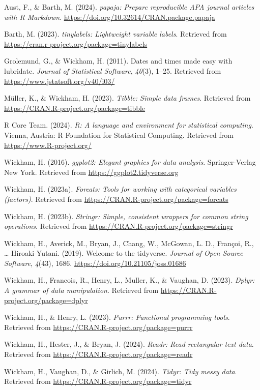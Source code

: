 \documentclass[
  man,floatsintext]{apa6}
\newlength{\cslhangindent}
\newenvironment{CSLReferences}[2] %
 {\begin{list}{}{%
  \setlength{\itemindent}{0pt}
  \setlength{\leftmargin}{0pt}
  \setlength{\parsep}{0pt}
  \ifodd #1
   \setlength{\leftmargin}{\cslhangindent}
   \setlength{\itemindent}{-1\cslhangindent}
  \fi
  \setlength{\itemsep}{#2\baselineskip}}}
 {\end{list}}
\begin{document}
\label{refs}
\begin{CSLReferences}{1}{0}
Aust, F., \& Barth, M. (2024). \emph{{papaja}: {Prepare} reproducible {APA} journal articles with {R Markdown}}. \url{https://doi.org/10.32614/CRAN.package.papaja}

Barth, M. (2023). \emph{{tinylabels}: Lightweight variable labels}. Retrieved from \url{https://cran.r-project.org/package=tinylabels}

Grolemund, G., \& Wickham, H. (2011). Dates and times made easy with {lubridate}. \emph{Journal of Statistical Software}, \emph{40}(3), 1--25. Retrieved from \url{https://www.jstatsoft.org/v40/i03/}

Müller, K., \& Wickham, H. (2023). \emph{Tibble: Simple data frames}. Retrieved from \url{https://CRAN.R-project.org/package=tibble}

R Core Team. (2024). \emph{R: A language and environment for statistical computing}. Vienna, Austria: R Foundation for Statistical Computing. Retrieved from \url{https://www.R-project.org/}

Wickham, H. (2016). \emph{ggplot2: Elegant graphics for data analysis}. Springer-Verlag New York. Retrieved from \url{https://ggplot2.tidyverse.org}

Wickham, H. (2023a). \emph{Forcats: Tools for working with categorical variables (factors)}. Retrieved from \url{https://CRAN.R-project.org/package=forcats}

Wickham, H. (2023b). \emph{Stringr: Simple, consistent wrappers for common string operations}. Retrieved from \url{https://CRAN.R-project.org/package=stringr}

Wickham, H., Averick, M., Bryan, J., Chang, W., McGowan, L. D., Françoi, R., \ldots{} Hiroaki Yutani. (2019). Welcome to the {tidyverse}. \emph{Journal of Open Source Software}, \emph{4}(43), 1686. \url{https://doi.org/10.21105/joss.01686}

Wickham, H., Francois, R., Henry, L., Muller, K., \& Vaughan, D. (2023). \emph{Dplyr: A grammar of data manipulation}. Retrieved from \url{https://CRAN.R-project.org/package=dplyr}

Wickham, H., \& Henry, L. (2023). \emph{Purrr: Functional programming tools}. Retrieved from \url{https://CRAN.R-project.org/package=purrr}

Wickham, H., Hester, J., \& Bryan, J. (2024). \emph{Readr: Read rectangular text data}. Retrieved from \url{https://CRAN.R-project.org/package=readr}

Wickham, H., Vaughan, D., \& Girlich, M. (2024). \emph{Tidyr: Tidy messy data}. Retrieved from \url{https://CRAN.R-project.org/package=tidyr}

\end{CSLReferences}
\end{document}
